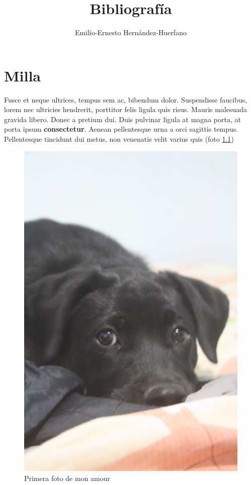 \documentclass[12pt,letterpaper,oneside]{book}
\title{Bibliografía}
\author{Emilio-Ernesto Hernández-Huerfano}
\begin{document}
\maketitle
\tableofcontents
\listoffigures


\chapter{Milla}
\noindent Fusce et neque ultrices, tempus sem ac, bibendum dolor. Suspendisse faucibus, lorem nec ultricies hendrerit, porttitor felis ligula quis risus. Mauris malesuada gravida libero. Donec a pretium dui. Duis pulvinar ligula at magna porta, at porta ipsum \textbf{consectetur}. Aenean pellentesque urna a orci sagittis tempus. Pellentesque tincidunt dui metus, non venenatis velit varius quis (foto \ref{milla_0})

\begin{figure}[ht]
\includegraphics[scale=.08]{img/milla.jpg}
\caption{Primera foto de mon amour}
\label{milla_0}

\end{figure}
\end{document}
